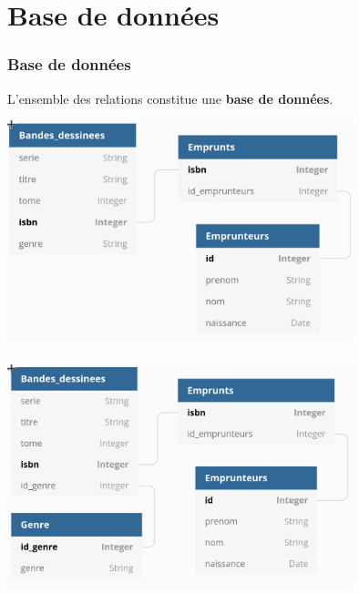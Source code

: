 \documentclass[svgnames,11pt]{beamer}
\begin{document}
\section{Base de données}
\begin{frame}
    \frametitle{Base de données}

    \begin{aretenir}[]
    L'ensemble des relations constitue une \textbf{base de données}.
    \end{aretenir}
\begin{center}
\includegraphics[width=10cm]{ressources/etrangere.png}
\end{center}
\end{frame}
\begin{frame}
    \frametitle{}

    \begin{center}
    \centering
    \includegraphics[width=10cm]{ressources/etrangere-2.png}
    \label{IMG}
    \end{center}

\end{frame}
\end{document}
